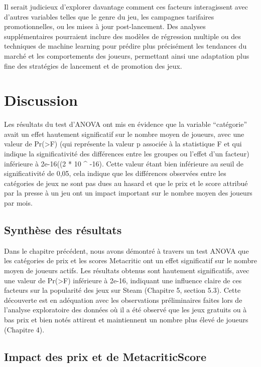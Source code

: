 \documentclass[mstat,12pt]{unswthesis}
\begin{document}
Il serait judicieux d'explorer davantage comment ces facteurs
interagissent avec d'autres variables telles que le genre du jeu, les
campagnes tarifaires promotionnelles, ou les mises à jour
post-lancement. Des analyses supplémentaires pourraient inclure des
modèles de régression multiple ou des techniques de machine learning
pour prédire plus précisément les tendances du marché et les
comportements des joueurs, permettant ainsi une adaptation plus fine des
stratégies de lancement et de promotion des jeux.

\hypertarget{discussion}{%
\chapter{Discussion}\label{discussion}}

Les résultats du test d'ANOVA ont mis en évidence que la variable
``catégorie'' avait un effet hautement significatif sur le nombre moyen
de joueurs, avec une valeur de Pr(\textgreater F) (qui représente la
valeur p associée à la statistique F et qui indique la significativité
des différences entre les groupes ou l'effet d'un facteur) inférieure à
2e-16((2 * 10 \^{} -16). Cette valeur étant bien inférieure au seuil de
significativité de 0,05, cela indique que les différences observées
entre les catégories de jeux ne sont pas dues au hasard et que le prix
et le score attribué par la presse à un jeu ont un impact important sur
le nombre moyen des joueurs par mois.

\hypertarget{synthuxe8se-des-ruxe9sultats}{%
\section{Synthèse des résultats}\label{synthuxe8se-des-ruxe9sultats}}

Dans le chapitre précédent, nous avons démontré à travers un test ANOVA
que les catégories de prix et les scores Metacritic ont un effet
significatif sur le nombre moyen de joueurs actifs. Les résultats
obtenus sont hautement significatifs, avec une valeur de
Pr(\textgreater F) inférieure à 2e-16, indiquant une influence claire de
ces facteurs sur la popularité des jeux sur Steam (Chapitre 5, section
5.3). Cette découverte est en adéquation avec les observations
préliminaires faites lors de l'analyse exploratoire des données où il a
été observé que les jeux gratuits ou à bas prix et bien notés attirent
et maintiennent un nombre plus élevé de joueurs (Chapitre 4).

\hypertarget{impact-des-prix-et-de-metacriticscore}{%
\section{Impact des prix et de
MetacriticScore}\label{impact-des-prix-et-de-metacriticscore}}
\end{document}

